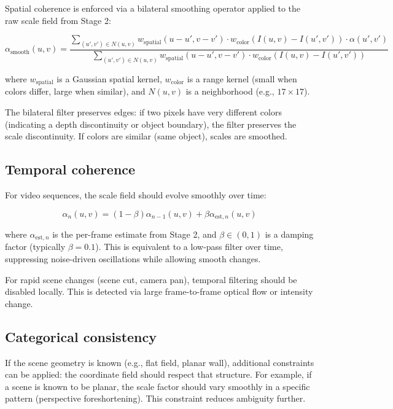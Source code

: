 \documentclass[11pt,twocolumn,a4paper]{article}
\theoremstyle{definition}
\begin{document}
Spatial coherence is enforced via a bilateral smoothing operator \citep{tomasi1998} applied to the raw scale field from Stage 2:

\begin{equation}
\alpha_{\text{smooth}}(u,v) = \frac{\sum_{(u',v') \in N(u,v)} w_{\text{spatial}}(u-u',v-v') \cdot w_{\text{color}}(I(u,v) - I(u',v')) \cdot \alpha(u',v')}{\sum_{(u',v') \in N(u,v)} w_{\text{spatial}}(u-u',v-v') \cdot w_{\text{color}}(I(u,v) - I(u',v'))}
\end{equation}

where $w_{\text{spatial}}$ is a Gaussian spatial kernel, $w_{\text{color}}$ is a range kernel (small when colors differ, large when similar), and $N(u,v)$ is a neighborhood (e.g., $17 \times 17$).

The bilateral filter preserves edges: if two pixels have very different colors (indicating a depth discontinuity or object boundary), the filter preserves the scale discontinuity. If colors are similar (same object), scales are smoothed.

\subsection{Temporal coherence}

For video sequences, the scale field should evolve smoothly over time:

\begin{equation}
\alpha_{n}(u,v) = (1 - \beta) \alpha_{n-1}(u,v) + \beta \alpha_{\text{est},n}(u,v)
\end{equation}

where $\alpha_{\text{est},n}$ is the per-frame estimate from Stage 2, and $\beta \in (0,1)$ is a damping factor (typically $\beta = 0.1$). This is equivalent to a low-pass filter over time, suppressing noise-driven oscillations while allowing smooth changes.

For rapid scene changes (scene cut, camera pan), temporal filtering should be disabled locally. This is detected via large frame-to-frame optical flow or intensity change.

\subsection{Categorical consistency}

If the scene geometry is known (e.g., flat field, planar wall), additional constraints can be applied: the coordinate field should respect that structure. For example, if a scene is known to be planar, the scale factor should vary smoothly in a specific pattern (perspective foreshortening). This constraint reduces ambiguity further.
\end{document}
